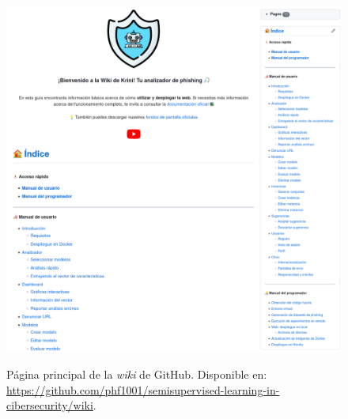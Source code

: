 \begin{figure}[h]
	\caption[Manual de usuario: \textit{wiki} de GitHub]{Página principal de la \textit{wiki} de GitHub. Disponible en: \url{https://github.com/phf1001/semisupervised-learning-in-cibersecurity/wiki}.}
	\centering
	\includegraphics[width=\textwidth]{../img/anexos/user_guide/9_wiki}
	\label{e-9:krini-wiki}
\end{figure}

